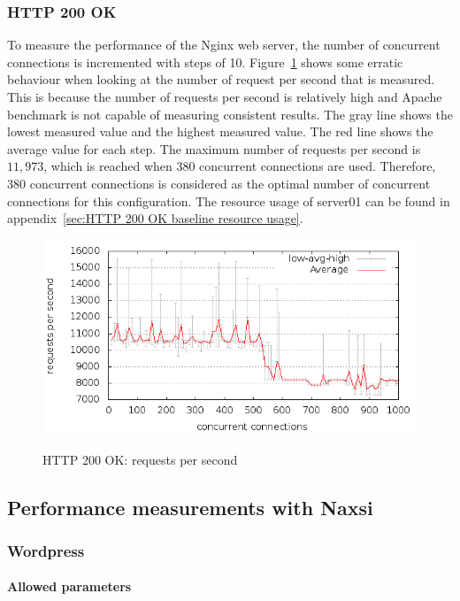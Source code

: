 \documentclass[Experiments]{subfiles}
\begin{document}
\subsubsection{HTTP 200 OK}
To measure the performance of the Nginx web server, the number of concurrent connections is incremented with steps of 10. Figure~\ref{fig:HTTP 200 OK: requests per second} shows some erratic behaviour when looking at the number of request per second that is measured. This is because the number of requests per second is relatively high and Apache benchmark is not capable of measuring consistent results. The gray line shows the lowest measured value and the highest measured value. The red line shows the average value for each step. The maximum number of requests per second is $11,973$, which is reached when $380$ concurrent connections are used. Therefore, 380 concurrent connections is considered as the optimal number of concurrent connections for this configuration. The resource usage of server01 can be found in appendix~\ref{sec:HTTP 200 OK baseline resource usage}.

\begin{figure}[H]
\caption{HTTP 200 OK: requests per second}
\centering
\includegraphics[scale=0.55] {images/results/baseline_200/output.png}
\label{fig:HTTP 200 OK: requests per second}
\end{figure}

\subsection{Performance measurements with Naxsi}

\subsubsection{Wordpress}

\paragraph*{Allowed parameters}
\end{document}
